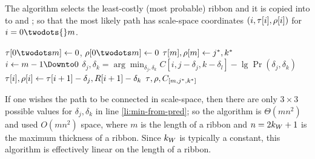 The  algorithm selects the least-costly (most probable) ribbon and it is
copied into to \OutputTrajectory{} and \OutputRadius{};
so that the most likely path has scale-space coordinates $(i, \tau{}[i],
\rho{}[i])$ for $i=0\twodots{}m$.



\begin{codebox}
 \label{alg:backtrack-ribbon}
\li $\OutputTrajectory{}{[0{\twodots}m]} \gets 0$, \quad $\OutputRadius{}[0{\twodots}m] \gets 0$             
\li $\tau{}{[m]}, \rho{}{[m]} \gets j^*, k^*$ \label{li:backtrack-best-last}
\li \For $i \gets m-1 \Downto 0$ \Do
\li      $\delta_j, \delta_k = \displaystyle{\arg\min_{\delta_j,\delta_k}C{[i,j{-}\delta_j,k{-}\delta_l]}{-}\lg \Pr(\delta_j,\delta_k)}$
\li      $\tau{}{[i]}, \rho{}[i] \gets \tau{}{[i+1]}-\delta_j, R{[i+1]}-\delta_k$                                                 \label{li:backtack-choose-pred}
    \End
\li \Return $\tau{}, \rho{}, C_{[m, j^*, k^*]}$
\end{codebox}


If one wishes the path to be connected in scale-space, then there are only $3\times3$ possible values for $\delta_j, \delta_k$ in line \ref{li:min-from-pred}; so the algorithm is $\Theta(m n^2)$ and used $O(m n^2)$ space, where $m$ is the length of a ribbon and $n=2k_W+1$ is the maximum thickness of a ribbon. Since $k_W$ is typically a constant, this algorithm is effectively linear on the length of a ribbon.


